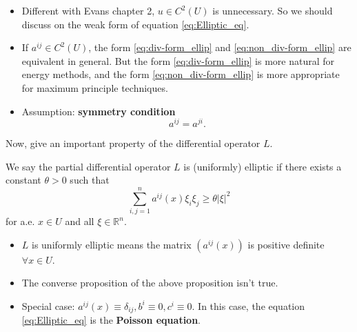 \begin{remark}
    \begin{itemize}
        \item Different with Evans chapter 2, $u\in C^{2}(U)$ is unnecessary. So we should discuss on the weak form of equation \eqref{eq:Elliptic_eq}.
        \item If $a^{ij}\in C^{2}(U)$, the form \eqref{eq:div-form_ellip} and \eqref{eq:non_div-form_ellip} are equivalent in general. But the form \eqref{eq:div-form_ellip} is more natural for energy methods, and the form \eqref{eq:non_div-form_ellip} is more appropriate for maximum principle techniques.
        \item Assumption: \textbf{symmetry condition}
        \begin{equation*}
            \label{eq:symmetry_cond}
            a^{ij}=a^{ji}.
        \end{equation*}
    \end{itemize}
\end{remark}
Now, give an important property of the differential operator $L$.
\begin{definition}
    \label{defn:uniformly_elliptic}
    We say the partial differential operator $L$ is (uniformly) elliptic if there exists a constant $\theta>0$ such that
    \begin{equation}
        \sum_{i,j=1}^{n}a^{ij}(x)\xi_{i}\xi_{j}\ge\theta |\xi|^{2}
    \end{equation}
    for a.e. $x\in U$ and all $\xi\in\mathbb{R}^{n}$.
\end{definition}

\begin{remark}
    \begin{itemize}
        \item $L$ is uniformly elliptic means the matrix $(a^{ij}(x))$ is positive definite $\forall x\in U$.
        \item The converse proposition of the above proposition isn't true.
        \item Special case: $a^{ij}(x)\equiv\delta_{ij}, b^{i}\equiv 0, c^{i}\equiv 0$. In this case, the equation \eqref{eq:Elliptic_eq} is the \textbf{Poisson equation}.
    \end{itemize}
\end{remark}

